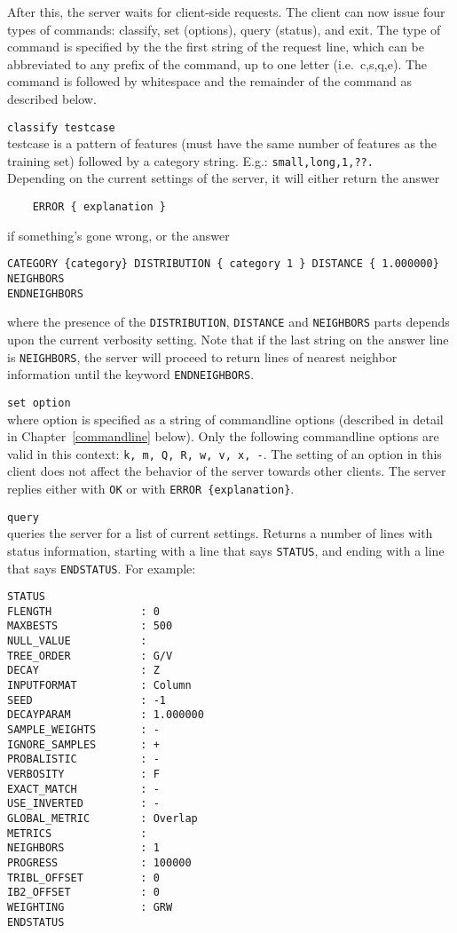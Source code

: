\documentclass{report}
\begin{document}
After this, the server waits for client-side requests.
The client can now issue four types of commands: classify, set
(options), query (status), and exit. The type of command is specified
by the the first string of the request line, which can be abbreviated
to any prefix of the command, up to one letter (i.e.~c,s,q,e). The
command is followed by whitespace and the remainder of the command as
described below.
\begin{description}
\item {\tt classify testcase}\\
      testcase is a pattern of features (must have the same number of
      features as the training set) followed by a category
      string. E.g.: {\tt small,long,1,??.}\\
      Depending on the current settings of the server, it will either
      return the answer 
      \begin{verbatim}
	ERROR { explanation }
      \end{verbatim}
      if something's gone wrong, or the answer
      \begin{verbatim}
CATEGORY {category} DISTRIBUTION { category 1 } DISTANCE { 1.000000} NEIGHBORS
ENDNEIGHBORS
      \end{verbatim}
      where the presence of the {\tt DISTRIBUTION}, {\tt DISTANCE} and {\tt NEIGHBORS}
parts depends upon the current verbosity setting. Note that if the
last string on the answer line is {\tt NEIGHBORS}, the server will
proceed to return lines of nearest neighbor information until the
keyword {\tt ENDNEIGHBORS}.
\item {\tt set option}\\
      where option is specified as a string of commandline options
(described in detail in Chapter~\ref{commandline} below). Only the
following commandline options are valid in this context: {\tt k, m, Q,
R, w, v, x, -}. The
setting of an option in this client 
does not affect the behavior of the server
towards other clients. The server replies either with {\tt OK} or with
{\tt ERROR \{explanation\}}. 
\item {\tt query}\\
      queries the server for a list of current settings. Returns a
number of lines with status information, starting with a line that
says {\tt STATUS}, and ending with a line that says {\tt ENDSTATUS}. For example:

\begin{footnotesize}
\begin{verbatim}
STATUS
FLENGTH              : 0
MAXBESTS             : 500
NULL_VALUE           : 
TREE_ORDER           : G/V
DECAY                : Z
INPUTFORMAT          : Column
SEED                 : -1
DECAYPARAM           : 1.000000
SAMPLE_WEIGHTS       : -
IGNORE_SAMPLES       : +
PROBALISTIC          : -
VERBOSITY            : F
EXACT_MATCH          : -
USE_INVERTED         : -
GLOBAL_METRIC        : Overlap
METRICS              : 
NEIGHBORS            : 1
PROGRESS             : 100000
TRIBL_OFFSET         : 0
IB2_OFFSET           : 0
WEIGHTING            : GRW
ENDSTATUS
\end{verbatim}
\end{footnotesize}


\end{description}
\end{document}
